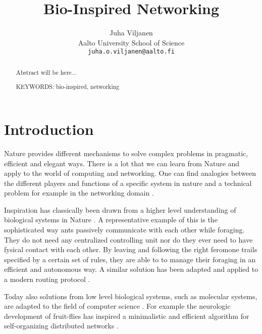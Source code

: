 \documentclass{IWORK2014}
\begin{document}

\title{Bio-Inspired Networking}

\author{Juha Viljanen\\
        Aalto University School of Science \\
	\texttt{juha.o.viljanen@aalto.fi}}
\maketitle


\begin{abstract}
  Abstract will be here...

\vspace{3mm}
\noindent KEYWORDS: bio-inspired, networking

\end{abstract}



\section{Introduction}

Nature provides different mechanisms to solve complex problems in pragmatic, efficient and elegant ways. There is a lot that we can learn from Nature and apply to the world of computing and networking. One can find analogies between the different players and functions of a specific system in nature and a technical problem for example in the networking domain \cite{dressler2010bio}.

Inspiration has classically been drawn from a higher level understanding of biological systems in Nature \cite{kroeker2011biology}. A representative example of this is the sophisticated way ants passively communicate with each other while foraging. They do not need any centralized controlling unit nor do they ever need to have fysical contact with each other. By leaving and following the right feromone trails specified by a certain set of rules, they are able to to manage their foraging in an efficient and autonomous way. A similar solution has been adapted and applied to a modern routing protocol \cite{dressler2010bio}.

Today also solutions from low level biological systems, such as molecular systems, are adapted to the field of computer science \cite{kroeker2011biology}. For example the neurologic development of fruit-flies has inspired a minimalistic and efficient algorithm for self-organizing distributed networks \cite{kroeker2011biology}.
\end{document}
